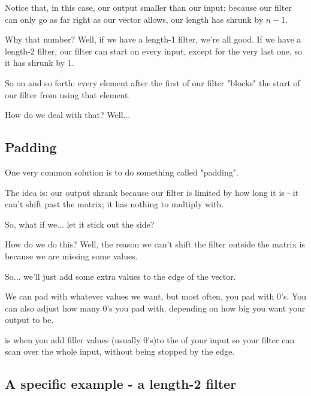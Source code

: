         Notice that, in this case, our output smaller than our input: because our filter can only go as far right as our vector allows, our length has shrunk by $n-1$.
        
        Why that number? Well, if we have a length-1 filter, we're all good. If we have a length-2 filter, our filter can start on every input, except for the very last one, so it has shrunk by 1.
        
        So on and so forth: every element after the first of our filter "blocks" the start of our filter from using that element.
        
        How do we deal with that? Well...
        
    \subsection{Padding}
    
        One very common solution is to do something called "padding".
        
        The idea is: our output shrank because our filter is limited by how long it is - it can't shift past the matrix; it has nothing to multiply with.
        
        So, what if we... let it stick out the side?
        
        How do we do this? Well, the reason we can't shift the filter outside the matrix is because we are missing some values. 
        
        So... we'll just add some extra values to the edge of the vector.
        
        We can pad with whatever values we want, but most often, you pad with 0's. You can also adjust how many 0's you pad with, depending on how big you want your output to be.\\
        
        \begin{definition}
             is when you add filler values (usually 0's)to the  of your input so your filter can scan over the whole input, without being stopped by the edge.
        \end{definition}
        
        
    
    \subsection{A specific example - a length-2 filter}
    
